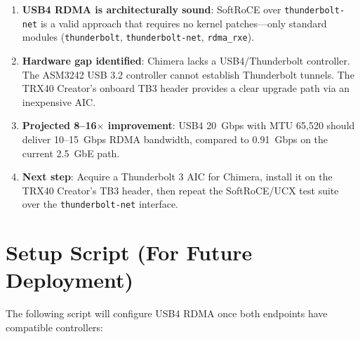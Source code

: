 \documentclass[11pt,letterpaper]{article}
\begin{document}
\begin{enumerate}
    \item \textbf{USB4 RDMA is architecturally sound}: SoftRoCE over \texttt{thunderbolt-net} is a valid approach that requires no kernel patches---only standard modules (\texttt{thunderbolt}, \texttt{thunderbolt-net}, \texttt{rdma\_rxe}).

    \item \textbf{Hardware gap identified}: Chimera lacks a USB4/Thunderbolt controller. The ASM3242 USB 3.2 controller cannot establish Thunderbolt tunnels. The TRX40 Creator's onboard TB3 header provides a clear upgrade path via an inexpensive AIC.

    \item \textbf{Projected 8--16$\times$ improvement}: USB4 20~Gbps with MTU 65,520 should deliver 10--15~Gbps RDMA bandwidth, compared to 0.91~Gbps on the current 2.5~GbE path.

    \item \textbf{Next step}: Acquire a Thunderbolt 3 AIC for Chimera, install it on the TRX40 Creator's TB3 header, then repeat the SoftRoCE/UCX test suite over the \texttt{thunderbolt-net} interface.
\end{enumerate}

\section{Setup Script (For Future Deployment)}
\label{sec:usb4-setup-script}

The following script will configure USB4 RDMA once both endpoints have compatible controllers:
\end{document}
